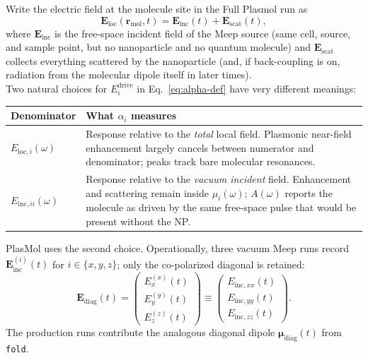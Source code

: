 \documentclass[11pt,a4paper]{article}
\begin{document}
Write the electric field at the molecule site in the Full Plasmol run as
\begin{equation}
  \mathbf{E}_{\mathrm{loc}}(\mathbf{r}_{\mathrm{mol}}, t)
  =
  \mathbf{E}_{\mathrm{inc}}(t)
  +
  \mathbf{E}_{\mathrm{scat}}(t),
  \label{eq:E-split}
\end{equation}
where $\mathbf{E}_{\mathrm{inc}}$ is the free-space incident field of the
Meep source (same cell, source, and sample point, but no nanoparticle and
no quantum molecule) and $\mathbf{E}_{\mathrm{scat}}$ collects everything
scattered by the nanoparticle (and, if back-coupling is on, radiation
from the molecular dipole itself in later times).\\

\noindent Two natural choices for $E_i^{\mathrm{drive}}$ in Eq.~\eqref{eq:alpha-def}
have very different meanings:

\begin{center}
\begin{tabular}{@{}lp{8.6cm}@{}}
\toprule
Denominator & What $\alpha_i$ measures \\
\midrule
$E_{\mathrm{loc},i}(\omega)$
  & Response relative to the \emph{total} local field.  Plasmonic
    near-field enhancement largely cancels between numerator and
    denominator; peaks track bare molecular resonances. \\
$E_{\mathrm{inc},ii}(\omega)$
  & Response relative to the \emph{vacuum incident} field.  Enhancement
    and scattering remain inside $\mu_i(\omega)$; $A(\omega)$ reports
    the molecule as driven by the same free-space pulse that would be
    present without the NP. \\
\bottomrule
\end{tabular}
\end{center}

\noindent PlasMol uses the second choice.  Operationally, three vacuum Meep runs
record $\mathbf{E}_{\mathrm{inc}}^{(i)}(t)$ for $i\in\{x,y,z\}$; only the
co-polarized diagonal is retained:
\begin{equation}
  \mathbf{E}_{\mathrm{diag}}(t)
  =
  \begin{pmatrix}
    E_x^{(x)}(t) \\
    E_y^{(y)}(t) \\
    E_z^{(z)}(t)
  \end{pmatrix}
  \equiv
  \begin{pmatrix}
    E_{\mathrm{inc},xx}(t) \\
    E_{\mathrm{inc},yy}(t) \\
    E_{\mathrm{inc},zz}(t)
  \end{pmatrix}.
  \label{eq:E-diag}
\end{equation}
The production runs contribute the analogous diagonal dipole
$\boldsymbol{\mu}_{\mathrm{diag}}(t)$ from \texttt{fold}.
\end{document}
